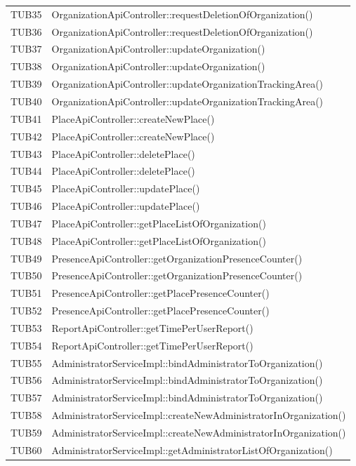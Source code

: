{\begin{longtable}{C{2cm} C{8cm}}
		TUB35 & OrganizationApiController::requestDeletionOfOrganization()\\
		TUB36 & OrganizationApiController::requestDeletionOfOrganization()\\
		TUB37 & OrganizationApiController::updateOrganization()\\
		TUB38 & OrganizationApiController::updateOrganization()\\
		TUB39 & OrganizationApiController::updateOrganizationTrackingArea()\\
		TUB40 & OrganizationApiController::updateOrganizationTrackingArea()\\
		TUB41 & PlaceApiController::createNewPlace()\\
		TUB42 & PlaceApiController::createNewPlace()\\
		TUB43 & PlaceApiController::deletePlace()\\
		TUB44 & PlaceApiController::deletePlace()\\
		TUB45 & PlaceApiController::updatePlace()\\
		TUB46 & PlaceApiController::updatePlace()\\
		TUB47 & PlaceApiController::getPlaceListOfOrganization()\\
		TUB48 & PlaceApiController::getPlaceListOfOrganization()\\
		TUB49 & PresenceApiController::getOrganizationPresenceCounter()\\
		TUB50 & PresenceApiController::getOrganizationPresenceCounter()\\
		TUB51 & PresenceApiController::getPlacePresenceCounter()\\
		TUB52 & PresenceApiController::getPlacePresenceCounter()\\
		TUB53 & ReportApiController::getTimePerUserReport()\\
		TUB54 & ReportApiController::getTimePerUserReport()\\
		TUB55 & AdministratorServiceImpl::bindAdministratorToOrganization()\\
		TUB56 & AdministratorServiceImpl::bindAdministratorToOrganization()\\
		TUB57 & AdministratorServiceImpl::bindAdministratorToOrganization()\\
		TUB58 & AdministratorServiceImpl::createNewAdministratorInOrganization()\\
		TUB59 & AdministratorServiceImpl::createNewAdministratorInOrganization()\\
		TUB60 & AdministratorServiceImpl::getAdministratorListOfOrganization()\\

\end{longtable}}
